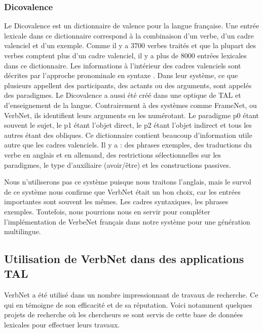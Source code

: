 \subsubsection{Dicovalence}
Le Dicovalence est un dictionnaire de valence pour la langue française. Une entrée lexicale dans ce dictionnaire correspond à la combinaison d'un verbe, d'un cadre valenciel et d'un exemple. Comme il y a 3700 verbes traités et que la plupart des verbes comptent plus d'un cadre valenciel, il y a plus de 8000 entrées lexicales dans ce dictionnaire. Les informations à l'intérieur des cadres valenciels sont décrites par l'approche pronominale en syntaxe \citep{11403/dicovalence/v1}. Dans leur système, ce que plusieurs appellent des participants, des actants ou des arguments, sont appelés des paradigmes. Le Dicovalence a aussi été créé dans une optique de TAL et d'enseignement de la langue. Contrairement à des systèmes comme FrameNet, ou VerbNet, ils identifient leurs arguments en les numérotant. Le paradigme p0 étant souvent le sujet, le p1 étant l'objet direct, le p2 étant l'objet indirect et tous les autres étant des obliques. Ce dictionnaire contient beaucoup d'information utile autre que les cadres valenciels. Il y a : des phrases exemples, des traductions du verbe en anglais et en allemand, des restrictions sélectionnelles sur les paradigmes, le type d'auxiliaire (avoir/être) et les constructions passives.

Nous n'utiliserons pas ce système puisque nous traitons l'anglais, mais le survol de ce système nous confirme que VerbNet était un bon choix, car les entrées importantes sont souvent les mêmes. Les cadres syntaxiques, les phrases exemples. Toutefois, nous pourrions nous en servir pour compléter l'implémentation de VerbeNet français dans notre système pour une génération multilingue.


\subsection {Utilisation de VerbNet dans des applications TAL}

VerbNet a été utilisé dans un nombre impressionnant de travaux de recherche. Ce qui en témoigne de son efficacité et de sa réputation. Voici notamment quelques projets de recherche où les chercheurs se sont servis de cette base de données lexicales pour effectuer leurs travaux.

